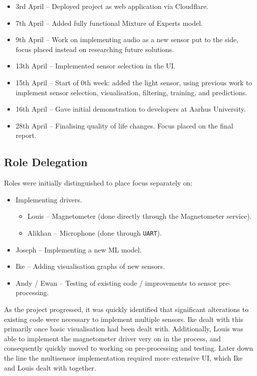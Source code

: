 \documentclass{article}
\begin{document}
\begin{itemize}
        \item 3rd April -- Deployed project as web application via Cloudflare.
        \item 7th April -- Added fully functional Mixture of Experts model.
        \item 9th April -- Work on implementing audio as a new sensor put to the side, focus placed instead on researching future solutions.
        \item 13th April -- Implemented sensor selection in the UI.
        \item 15th April -- Start of 0th week: added the light sensor, using previous work to implement sensor selection, visualisation, filtering, training, and predictions.
        \item 16th April -- Gave initial demonstration to developers at Aarhus University.
        \item 28th April -- Finalising quality of life changes. Focus placed on the final report.
\end{itemize}

\subsection{Role Delegation}%
\label{subsec:delegation}

Roles were initially distinguished to place focus separately on:
\begin{itemize}
  \item Implementing drivers.
        \begin{itemize}
          \item Louis -- Magnetometer (done directly through the Magnetometer service).
          \item Alikhan -- Microphone (done through \verb|UART|).
        \end{itemize}
  \item Joseph -- Implementing a new ML model.
  \item Ike -- Adding visualisation graphs of new sensors.
  \item Andy / Ewan -- Testing of existing code / improvements to sensor pre-processing.
\end{itemize}

As the project progressed, it was quickly identified that significant alterations to existing code were necessary to implement multiple sensors. Ike dealt with this primarily once basic visualisation had been dealt with. Additionally, Louis was able to implement the magnetometer driver very on in the process, and consequently quickly moved to working on pre-processing and testing. Later down the line the multisensor implementation required more extensive UI, which Ike and Louis dealt with together. \\
\end{document}
